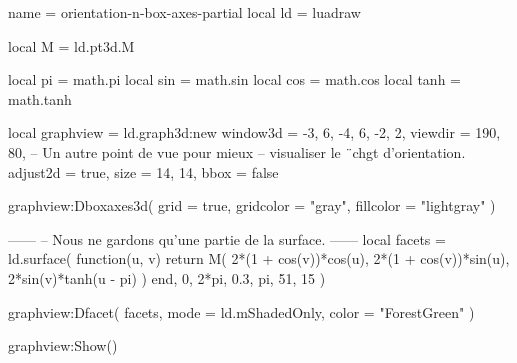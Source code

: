 \documentclass[border = 3pt]{standalone}
\begin{document}
\begin{luadraw*}{name = orientation-n-box-axes-partial}
local ld = luadraw

local M = ld.pt3d.M

local pi   = math.pi
local sin  = math.sin
local cos  = math.cos
local tanh = math.tanh

local graphview = ld.graph3d:new{
  window3d = {-3, 6, -4, 6, -2, 2},
  viewdir  = {190, 80},  -- Un autre point de vue pour mieux
                         -- visualiser le ¨chgt d'orientation.
  adjust2d = true,
  size     = {14, 14},
  bbox     = false
}

graphview:Dboxaxes3d({
  grid      = true,
  gridcolor = "gray",
  fillcolor = "lightgray"
})

------
-- Nous ne gardons qu'une partie de la surface.
------
local facets = ld.surface(
  function(u, v)
    return M(
      2*(1 + cos(v))*cos(u),
      2*(1 + cos(v))*sin(u),
      2*sin(v)*tanh(u - pi)
    )
  end,
  0, 2*pi, 0.3, pi,
  {51, 15}
)

graphview:Dfacet(
  facets,
  {
    mode  = ld.mShadedOnly,
    color = "ForestGreen"
  }
)

graphview:Show()
\end{luadraw*}
\end{document}
